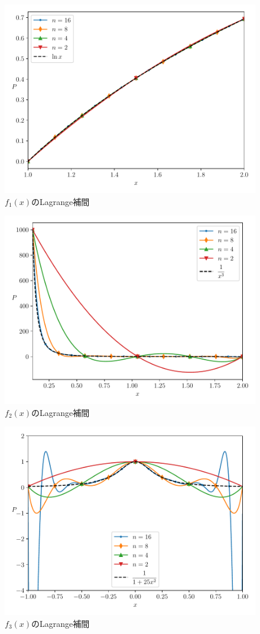 \documentclass[a4j, titlepage]{jsarticle}
\numberwithin{equation}{section}
\begin{document}
                \begin{figure}[h]
                    \centering
                    \includegraphics[width=0.8\hsize]{kadai2/1/f1.pdf}
                    \caption{$f_1(x)$のLagrange補間}
                    \label{fig:f1}
                \end{figure}
                \begin{figure}[h]
                    \centering
                    \includegraphics[width=0.8\hsize]{kadai2/1/f2.pdf}
                    \caption{$f_2(x)$のLagrange補間}
                    \label{fig:f2}
                \end{figure}
                \begin{figure}[h]
                    \centering
                    \includegraphics[width=0.8\hsize]{kadai2/1/f3.pdf}
                    \caption{$f_3(x)$のLagrange補間}
                    \label{fig:f3}
                \end{figure}
\end{document}
